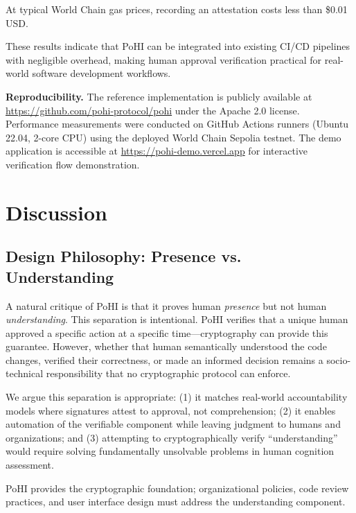\documentclass[conference]{IEEEtran}
\begin{document}
At typical World Chain gas prices, recording an attestation costs less than \$0.01 USD.

These results indicate that PoHI can be integrated into existing CI/CD pipelines with negligible overhead, making human approval verification practical for real-world software development workflows.

\textbf{Reproducibility.} The reference implementation is publicly available at \url{https://github.com/pohi-protocol/pohi} under the Apache 2.0 license. Performance measurements were conducted on GitHub Actions runners (Ubuntu 22.04, 2-core CPU) using the deployed World Chain Sepolia testnet. The demo application is accessible at \url{https://pohi-demo.vercel.app} for interactive verification flow demonstration.

\section{Discussion}

\subsection{Design Philosophy: Presence vs. Understanding}

A natural critique of PoHI is that it proves human \textit{presence} but not human \textit{understanding}. This separation is intentional. PoHI verifies that a unique human approved a specific action at a specific time---cryptography can provide this guarantee. However, whether that human semantically understood the code changes, verified their correctness, or made an informed decision remains a socio-technical responsibility that no cryptographic protocol can enforce.

We argue this separation is appropriate: (1) it matches real-world accountability models where signatures attest to approval, not comprehension; (2) it enables automation of the verifiable component while leaving judgment to humans and organizations; and (3) attempting to cryptographically verify ``understanding'' would require solving fundamentally unsolvable problems in human cognition assessment.

PoHI provides the cryptographic foundation; organizational policies, code review practices, and user interface design must address the understanding component.
\end{document}
